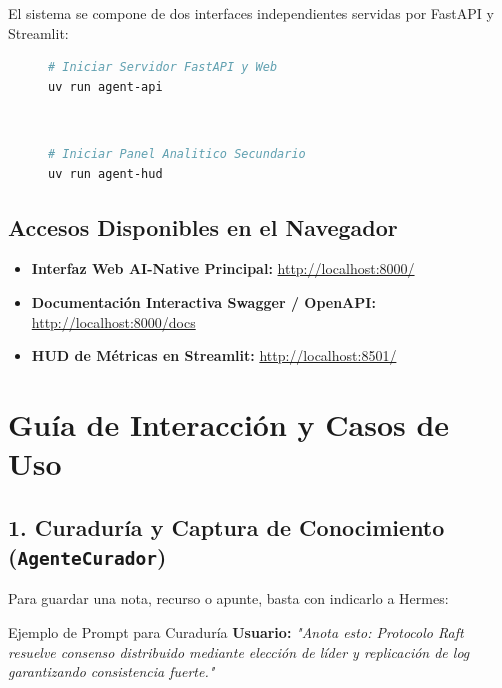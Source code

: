 \documentclass[11pt,a4paper]{article}
\begin{document}
El sistema se compone de dos interfaces independientes servidas por FastAPI y Streamlit:

\begin{figure}[!htbp]
\centering
\begin{minipage}{0.48\textwidth}
    \begin{lstlisting}[language=bash, caption={Terminal 1: API Gateway}]
# Iniciar Servidor FastAPI y Web
uv run agent-api
    \end{lstlisting}
\end{minipage}
~
\begin{minipage}{0.48\textwidth}
    \begin{lstlisting}[language=bash, caption={Terminal 2: HUD Streamlit (Opcional)}]
# Iniciar Panel Analitico Secundario
uv run agent-hud
    \end{lstlisting}
\end{minipage}
\end{figure}

\subsection{Accesos Disponibles en el Navegador}
\begin{itemize}
    \item \textbf{Interfaz Web AI-Native Principal:} \href{http://localhost:8000/}{http://localhost:8000/}
    \item \textbf{Documentación Interactiva Swagger / OpenAPI:} \href{http://localhost:8000/docs}{http://localhost:8000/docs}
    \item \textbf{HUD de Métricas en Streamlit:} \href{http://localhost:8501/}{http://localhost:8501/}
\end{itemize}

\section{Guía de Interacción y Casos de Uso}

\subsection{1. Curaduría y Captura de Conocimiento (\texttt{AgenteCurador})}
Para guardar una nota, recurso o apunte, basta con indicarlo a Hermes:

\begin{infobox}{Ejemplo de Prompt para Curaduría}
\textbf{Usuario:} \textit{"Anota esto: Protocolo Raft resuelve consenso distribuido mediante elección de líder y replicación de log garantizando consistencia fuerte."}
\end{infobox}
\end{document}
